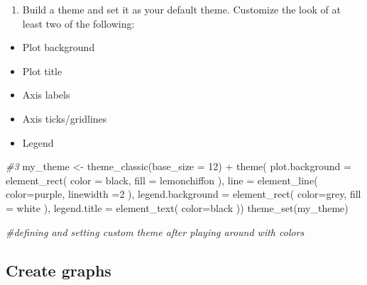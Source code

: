 \documentclass[
]{article}
\newenvironment{Shaded}{\begin{snugshade}}{\end{snugshade}}
\newcommand{\AttributeTok}[1]{\textcolor[rgb]{0.77,0.63,0.00}{#1}}
\newcommand{\CommentTok}[1]{\textcolor[rgb]{0.56,0.35,0.01}{\textit{#1}}}
\newcommand{\DecValTok}[1]{\textcolor[rgb]{0.00,0.00,0.81}{#1}}
\newcommand{\FunctionTok}[1]{\textcolor[rgb]{0.00,0.00,0.00}{#1}}
\newcommand{\NormalTok}[1]{#1}
\newcommand{\OtherTok}[1]{\textcolor[rgb]{0.56,0.35,0.01}{#1}}
\newcommand{\SpecialCharTok}[1]{\textcolor[rgb]{0.00,0.00,0.00}{#1}}
\newcommand{\StringTok}[1]{\textcolor[rgb]{0.31,0.60,0.02}{#1}}
\providecommand{\tightlist}{%
  \setlength{\itemsep}{0pt}\setlength{\parskip}{0pt}}
\begin{document}
\begin{enumerate}
\def\labelenumi{\arabic{enumi}.}
\setcounter{enumi}{2}
\tightlist
\item
  Build a theme and set it as your default theme. Customize the look of
  at least two of the following:
\end{enumerate}

\begin{itemize}
\tightlist
\item
  Plot background
\item
  Plot title
\item
  Axis labels
\item
  Axis ticks/gridlines
\item
  Legend
\end{itemize}

\begin{Shaded}
\begin{Highlighting}[]
\CommentTok{\#3}
\NormalTok{my\_theme }\OtherTok{\textless{}{-}} \FunctionTok{theme\_classic}\NormalTok{(}\AttributeTok{base\_size =} \DecValTok{12}\NormalTok{) }\SpecialCharTok{+} 
  \FunctionTok{theme}\NormalTok{(}
    \AttributeTok{plot.background =} \FunctionTok{element\_rect}\NormalTok{(}
      \AttributeTok{color =} \StringTok{\textquotesingle{}black\textquotesingle{}}\NormalTok{,}
      \AttributeTok{fill =} \StringTok{\textquotesingle{}lemonchiffon\textquotesingle{}}
\NormalTok{    ),}
    \AttributeTok{line =} \FunctionTok{element\_line}\NormalTok{(}
      \AttributeTok{color=}\StringTok{\textquotesingle{}purple\textquotesingle{}}\NormalTok{,}
      \AttributeTok{linewidth =}\DecValTok{2}
\NormalTok{    ),}
    \AttributeTok{legend.background =} \FunctionTok{element\_rect}\NormalTok{(}
      \AttributeTok{color=}\StringTok{\textquotesingle{}grey\textquotesingle{}}\NormalTok{,}
      \AttributeTok{fill =} \StringTok{\textquotesingle{}white\textquotesingle{}}
\NormalTok{    ),}
    \AttributeTok{legend.title =} \FunctionTok{element\_text}\NormalTok{(}
      \AttributeTok{color=}\StringTok{\textquotesingle{}black\textquotesingle{}}
\NormalTok{        ))}
    \FunctionTok{theme\_set}\NormalTok{(my\_theme)}
    
    \CommentTok{\#defining and setting custom theme after playing around with colors}
\end{Highlighting}
\end{Shaded}

\hypertarget{create-graphs}{%
\subsection{Create graphs}\label{create-graphs}}
\end{document}
